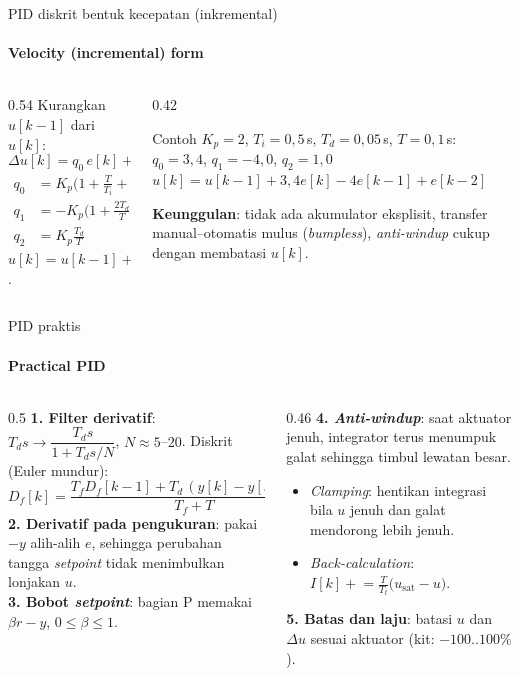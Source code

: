 \documentclass[aspectratio=169,10pt]{beamer}
\begin{document}
\begin{frame}{PID diskrit bentuk kecepatan (inkremental)}
	\framesubtitle{Velocity (incremental) form}
	\begin{columns}[T]
		\begin{column}{0.54\textwidth}
			\small
			Kurangkan $u[k-1]$ dari $u[k]$:
			\[
				\Delta u[k] = q_0\,e[k] + q_1\,e[k-1] + q_2\,e[k-2]
			\]
			\begin{align*}
				q_0 &= K_p\Big(1 + \frac{T}{T_i} + \frac{T_d}{T}\Big)\\
				q_1 &= -K_p\Big(1 + \frac{2T_d}{T}\Big)\\
				q_2 &= K_p\frac{T_d}{T}
			\end{align*}
			$u[k] = u[k-1] + \Delta u[k]$.
		\end{column}
		\begin{column}{0.42\textwidth}
			\begin{exampleblock}{Contoh}
				\small
				$K_p=2$, $T_i=0{,}5$\,s, $T_d=0{,}05$\,s, $T=0{,}1$\,s:\\
				$q_0 = 3{,}4$, $q_1 = -4{,}0$, $q_2 = 1{,}0$\\[3pt]
				$u[k] = u[k-1] + 3{,}4e[k] - 4e[k-1] + e[k-2]$
			\end{exampleblock}
			\small
			\textbf{Keunggulan}: tidak ada akumulator eksplisit, transfer manual--otomatis mulus (\textit{bumpless}), \textit{anti-windup} cukup dengan membatasi $u[k]$.
		\end{column}
	\end{columns}
\end{frame}

\begin{frame}{PID praktis}
	\framesubtitle{Practical PID}
	\begin{columns}[T]
		\begin{column}{0.5\textwidth}
			\small
			\textbf{1. Filter derivatif}: $T_ds \rightarrow \dfrac{T_d s}{1+T_ds/N}$, $N \approx 5$--$20$. Diskrit (Euler mundur):
			\[
				D_f[k] = \frac{T_f D_f[k-1] + T_d\,(y[k]-y[k-1])}{T_f + T},\ \ T_f = \frac{T_d}{N}
			\]
			\textbf{2. Derivatif pada pengukuran}: pakai $-y$ alih-alih $e$, sehingga perubahan tangga \textit{setpoint} tidak menimbulkan lonjakan $u$.\\[3pt]
			\textbf{3. Bobot \textit{setpoint}}: bagian P memakai $\beta r - y$, $0\le\beta\le1$.
		\end{column}
		\begin{column}{0.46\textwidth}
			\small
			\textbf{4. \textit{Anti-windup}}: saat aktuator jenuh, integrator terus menumpuk galat sehingga timbul lewatan besar.
			\begin{itemize}
				\item \textit{Clamping}: hentikan integrasi bila $u$ jenuh dan galat mendorong lebih jenuh.
				\item \textit{Back-calculation}: $I[k] \mathrel{+}= \frac{T}{T_t}\big(u_{\text{sat}}-u\big)$.
			\end{itemize}
			\textbf{5. Batas dan laju}: batasi $u$ dan $\Delta u$ sesuai aktuator (kit: $-100$..$100\%$).
		\end{column}
	\end{columns}
\end{frame}
\end{document}
